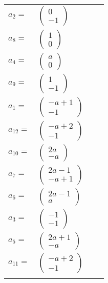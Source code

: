 \documentclass[1p]{elsarticle_modified}
\theoremstyle{definition}
\begin{document}
\begin{tabular}{m{7pt} m{180pt} m{7pt} m{180pt} }
\flushright $a_{2}=$&$\begin{pmatrix}0\\-1\end{pmatrix}$ \\
\flushright $a_{8}=$&$\begin{pmatrix}1\\0\end{pmatrix}$ \\
\flushright $a_{4}=$&$\begin{pmatrix}a\\0\end{pmatrix}$ \\
\flushright $a_{9}=$&$\begin{pmatrix}1\\-1\end{pmatrix}$ \\
\flushright $a_{1}=$&$\begin{pmatrix}- a+1\\-1\end{pmatrix}$ \\
\flushright $a_{12}=$&$\begin{pmatrix}- a+2\\-1\end{pmatrix}$ \\
\flushright $a_{10}=$&$\begin{pmatrix}2 a\\- a\end{pmatrix}$ \\
\flushright $a_{7}=$&$\begin{pmatrix}2 a-1\\- a+1\end{pmatrix}$ \\
\flushright $a_{6}=$&$\begin{pmatrix}2 a-1\\a\end{pmatrix}$ \\
\flushright $a_{3}=$&$\begin{pmatrix}-1\\-1\end{pmatrix}$ \\
\flushright $a_{5}=$&$\begin{pmatrix}2 a+1\\- a\end{pmatrix}$ \\
\flushright $a_{11}=$&$\begin{pmatrix}- a+2\\-1\end{pmatrix}$\\&\end{tabular}
\end{document}
